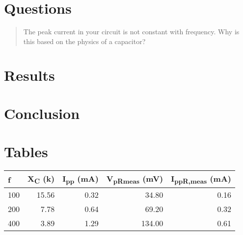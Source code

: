 \documentclass{article}
\begin{document}
		
	\section{}

	\section{Questions}
		\begin{quotation}
			The peak current in your circuit is not constant with frequency. Why is this based on the physics of a capacitor?
		\end{quotation}
		

	\section{Results}
	\section{Conclusion}
	\section*{Tables}

		\begin{table}[]
			\begin{tabular}{@{}rrrrr@{}}
			\toprule
			\multicolumn{1}{l}{f} & \multicolumn{1}{l}{X\textsubscript{C} (k\textOmega)} & \multicolumn{1}{l}{I\textsubscript{pp} (mA)} & \multicolumn{1}{l}{V\textsubscript{pRmeas} (mV)} & \multicolumn{1}{l}{I\textsubscript{ppR,meas} (mA)} \\ \midrule
			100 & 15.56 & 0.32 & 34.80  & 0.16 \\
			200 & 7.78  & 0.64 & 69.20  & 0.32 \\
			400 & 3.89  & 1.29 & 134.00 & 0.61 \\ \bottomrule
		\end{tabular}
	\end{table}
\end{document}
